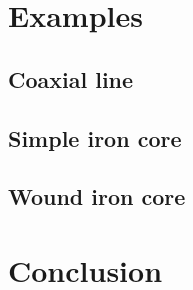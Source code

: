 

\section{Examples}

\subsection{Coaxial line}




\subsection{Simple iron core}



\subsection{Wound iron core}




\section{Conclusion}





